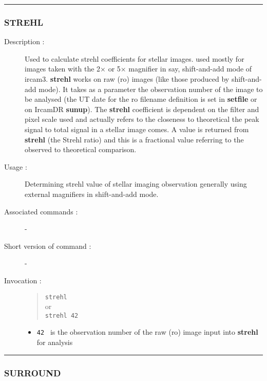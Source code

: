 \hrule 
\subsubsection*{\label{STREHL}STREHL}

\begin{description}

\item[Description :] Used to calculate strehl coefficients for stellar
images.  used mostly for images taken with the 2$\times$ or 5$\times$
magnifier in say, shift-and-add mode of {\sc ircam3}.  {\bf strehl}
works on raw ({\sc ro}) images (like those produced by shift-and-add
mode).  It takes as a parameter the observation number of the image to
be analysed (the UT date for the {\sc ro} filename definition is set in
{\bf setfile} or on {\sc IrcamDR} {\bf sunup}).  The {\bf strehl}
coefficient is dependent on the filter and pixel scale used and
actually refers to the closeness to theoretical the peak signal to
total signal in a stellar image comes.  A value is returned from {\bf
strehl} (the Strehl ratio) and this is a fractional value referring to
the observed to theoretical comparison.

\item[Usage :] Determining strehl value of stellar imaging observation 
generally using external magnifiers in shift-and-add mode.
\item[Associated commands :] -
\item[Short version of command :] -
\item[Invocation :]

\begin{quote}{\tt  strehl }\\
or \\
{\tt strehl 42 }
\end{quote}

\begin{itemize}

\item {\tt 42 } is the observation number of the raw ({\sc ro}) image input
 into {\bf strehl} for analysis
\end{itemize}

\end{description}

\hrule 
\subsubsection*{\label{SURROUND}SURROUND}

